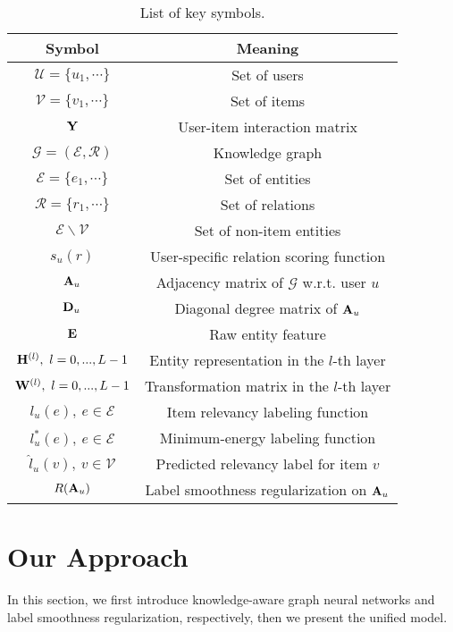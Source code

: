 \documentclass[sigconf]{acmart}
\begin{document}
	\begin{table}[b]
		\vspace{-0.1in}
		\centering
		\setlength{\tabcolsep}{4pt}
		\begin{tabular}{c|c}
			\hline
			Symbol & Meaning \\
			\hline
			$\mathcal U = \{u_1, \cdots\}$ & Set of users \\
			$\mathcal V = \{v_1, \cdots\}$ & Set of items \\
			${\bf Y}$ & User-item interaction matrix \\
			$\mathcal G = (\mathcal E, \mathcal R)$ & Knowledge graph \\
			$\mathcal E = \{e_1, \cdots\}$ & Set of entities \\
			$\mathcal R = \{r_1, \cdots\}$ & Set of relations \\
			$\mathcal E \backslash \mathcal V$ & Set of non-item entities \\
			$s_u(r)$ & User-specific relation scoring function \\
			${\bf A}_u$ & Adjacency matrix of $\mathcal G$ w.r.t. user $u$ \\
			${\bf D}_u$ & Diagonal degree matrix of ${\bf A}_u$ \\
			${\bf E}$ & Raw entity feature \\
			${\bf H}^{(l)}, \ l = 0, ..., L-1$ & Entity representation in the $l$-th layer \\
			${\bf W}^{(l)}, \ l = 0, ..., L-1$ & Transformation matrix in the $l$-th layer \\
			$l_u(e), \ e \in \mathcal E$ & Item relevancy labeling function \\
			$l_u^*(e), \ e \in \mathcal E$ & Minimum-energy labeling function \\
			$\hat l_u(v), \ v \in \mathcal V$ & Predicted relevancy label for item $v$ \\
			$R({\bf A}_u)$ & Label smoothness regularization on ${\bf A}_u$ \\
			\hline
		\end{tabular}
		\vspace{0.05in}
		\caption{List of key symbols.}
		\label{table:notation}
		\vspace{-0.15in}
	\end{table}
		
	
	
	
\section{Our Approach}
	In this section, we first introduce knowledge-aware graph neural networks and label smoothness regularization, respectively, then we present the unified model.
	
\end{document}

